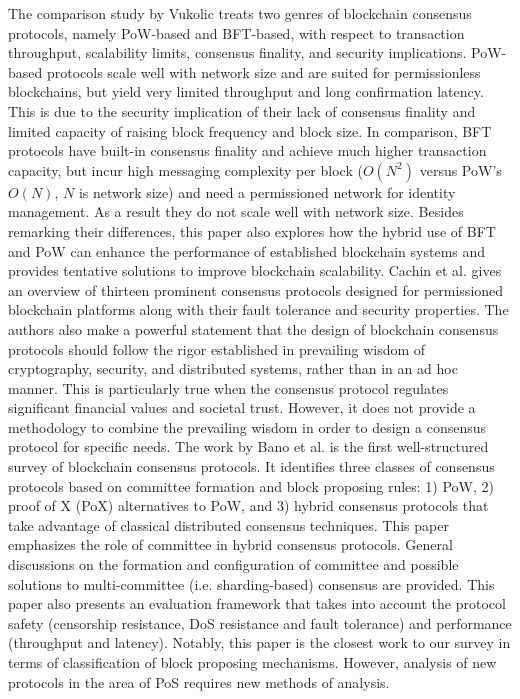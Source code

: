 \label{sec:prev-survey}
The comparison study by Vukolic  treats two genres of blockchain consensus protocols, namely PoW-based and BFT-based, with respect to transaction throughput, scalability limits, consensus finality, and security implications. PoW-based protocols scale well with network size and are suited for permissionless blockchains, but yield very limited throughput and long confirmation latency. This is due to the security implication of their lack of consensus finality and limited capacity of raising block frequency and block size. In comparison, BFT protocols have built-in consensus finality and achieve much higher transaction capacity, but incur high messaging complexity per block ($O(N^2)$ versus PoW's $O(N)$, $N$ is network size) and need a permissioned network for identity management. As a result they do not scale well with network size. Besides remarking their differences, this paper also explores how the hybrid use of BFT and PoW can enhance the performance of established blockchain systems and provides tentative solutions to improve blockchain scalability.
Cachin et al.  gives an overview of thirteen prominent consensus protocols designed for permissioned blockchain platforms along with their fault tolerance and security properties. The authors also make a powerful statement that the design of blockchain consensus protocols should follow the rigor established in prevailing wisdom of cryptography, security, and distributed systems, rather than in an ad hoc manner. This is particularly true when the consensus protocol regulates significant financial values and societal trust.
However, it does not provide a methodology to combine the prevailing wisdom in order to design a consensus protocol for specific needs.
The work by Bano et al.  is the first well-structured survey of blockchain consensus protocols. It identifies three classes of consensus protocols based on committee formation and block proposing rules: 1) PoW, 2) proof of X (PoX) alternatives to PoW, and 3) hybrid consensus protocols that take advantage of classical distributed consensus techniques. 
This paper emphasizes the role of committee in hybrid consensus protocols. General discussions on the formation and configuration of committee and possible solutions to multi-committee (i.e. sharding-based) consensus are provided.
This paper also presents an evaluation framework that takes into account the protocol safety (censorship resistance, DoS resistance and fault tolerance) and performance (throughput and latency).
Notably, this paper is the closest work to our survey in terms of classification of block proposing mechanisms. However, analysis of new protocols in the area of PoS requires new methods of analysis. 
